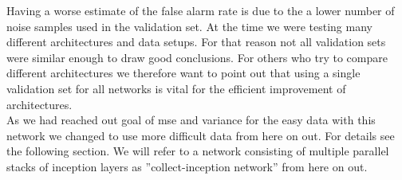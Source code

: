Having a worse estimate of the false alarm rate is due to the a lower number of noise samples used in the validation set. At the time we were testing many different architectures and data setups. For that reason not all validation sets were similar enough to draw good conclusions. For others who try to compare different architectures we therefore want to point out that using a single validation set for all networks is vital for the efficient improvement of architectures.\smallskip\\%
As we had reached out goal of \gls{mse} and variance for the easy data with this network we changed to use more difficult data from here on out. For details see the following section. We will refer to a network consisting of multiple parallel stacks of inception layers as ''collect-inception network'' from here on out.
